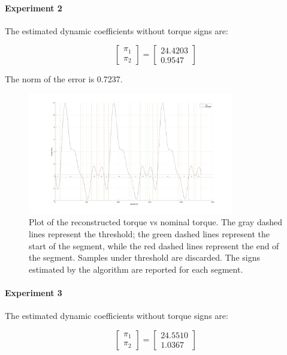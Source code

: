 \documentclass{article}
\begin{document}
\paragraph{Experiment 2} The estimated dynamic coefficients without torque signs are:

\[\begin{bmatrix}
\pi_1  \\ \pi_2 
\end{bmatrix}=\begin{bmatrix}
24.4203 \\ 0.9547
\end{bmatrix}\]

The norm of the error is 0.7237.

\begin{figure}[!htbp]
\centering
\includegraphics[width=0.8\textwidth]{images/1-dof/results_experiment2.png}
\caption{Plot of the reconstructed torque vs nominal torque. The gray dashed lines represent the threshold; the green dashed lines represent the start of the segment, while the red dashed lines represent the end of the segment. Samples under threshold are discarded. The signs estimated by the algorithm are reported for each segment.}
\end{figure}
\FloatBarrier

\paragraph{Experiment 3} The estimated dynamic coefficients without torque signs are:

\[\begin{bmatrix}
\pi_1  \\ \pi_2 
\end{bmatrix}=\begin{bmatrix}
24.5510 \\ 1.0367
\end{bmatrix}\]
\end{document}
